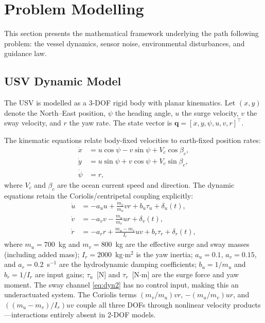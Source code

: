 \documentclass[review]{cas-dc}
\begin{document}
\section{Problem Modelling}
\label{sec:model}

This section presents the mathematical framework underlying the path following problem: the vessel dynamics, sensor noise, environmental disturbances, and guidance law.

\subsection{USV Dynamic Model}
\label{sec:dynamics}

The USV is modelled as a 3-DOF rigid body with planar kinematics. Let $(x,y)$ denote the North--East position, $\psi$ the heading angle, $u$ the surge velocity, $v$ the sway velocity, and $r$ the yaw rate. The state vector is $\mathbf{q} = [x, y, \psi, u, v, r]^\top$.

The kinematic equations relate body-fixed velocities to earth-fixed position rates:
\begin{align}
\dot{x} &= u\cos\psi - v\sin\psi + V_c\cos\beta_c, \label{eq:kin1}\\
\dot{y} &= u\sin\psi + v\cos\psi + V_c\sin\beta_c, \label{eq:kin2}\\
\dot{\psi} &= r, \label{eq:kin3}
\end{align}
where $V_c$ and $\beta_c$ are the ocean current speed and direction. The dynamic equations retain the Coriolis/centripetal coupling explicitly:
\begin{align}
\dot{u} &= -a_u u + \frac{m_v}{m_u}vr + b_u\tau_u + \delta_u(t), \label{eq:dyn1}\\
\dot{v} &= -a_v v - \frac{m_u}{m_v}ur + \delta_v(t), \label{eq:dyn2}\\
\dot{r} &= -a_r r + \frac{m_u - m_v}{I_r}uv + b_r\tau_r + \delta_r(t), \label{eq:dyn3}
\end{align}
where $m_u = 700$~kg and $m_v = 800$~kg are the effective surge and sway masses (including added mass); $I_r = 2000$~kg$\cdot$m$^2$ is the yaw inertia; $a_u = 0.1$, $a_v = 0.15$, and $a_r = 0.2$~s$^{-1}$ are the hydrodynamic damping coefficients; $b_u = 1/m_u$ and $b_r = 1/I_r$ are input gains; $\tau_u$~[N] and $\tau_r$~[N$\cdot$m] are the surge force and yaw moment. The sway channel \eqref{eq:dyn2} has no control input, making this an underactuated system. The Coriolis terms $(m_v/m_u)vr$, $-(m_u/m_v)ur$, and $((m_u - m_v)/I_r)uv$ couple all three DOFs through nonlinear velocity products---interactions entirely absent in 2-DOF models.
\end{document}
